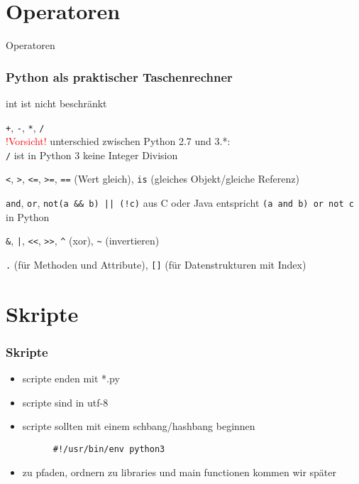 \documentclass{beamer}
\begin{document}
\section{Operatoren}
\begin{frame}[fragile]{Operatoren}
   \frametitle{Python als praktischer Taschenrechner} 
   \begin{description}
       \item<+-> int ist nicht beschränkt
	\item<+->[mathematisch] \alert{\texttt{+}}, \alert{\texttt{-}}, \alert{\texttt{*}}, \alert{\texttt{/}} \\
             \textcolor{red}{!Vorsicht!} unterschied zwischen Python 2.7 und 3.*:\\
      \lstinline+/+ ist in Python 3 keine Integer Division
	    \item<+->[vergleichend] \alert{\texttt{<}}, \alert{\texttt{>}}, \alert{\texttt{<=}}, \alert{\texttt{>=}}, \alert{\texttt{==}} (Wert gleich), \alert{\texttt{is}} (gleiches Objekt/gleiche Referenz)
	    \item<+->[logisch] \alert{\texttt{and}}, \alert{\texttt{or}}, \alert{\texttt{not}}\alert{\texttt{(a \&\& b) || (!c)}} aus C oder Java entspricht \alert{\texttt{(a and b) or not c}} in Python
	    \item<+->[bitweise] \alert{\texttt{\&}}, \alert{\texttt{|}}, \alert{\texttt{<<}}, \alert{\texttt{>>}}, \alert{\texttt{\^}} (xor), \alert{\texttt{\~}} (invertieren)
	    \item<+->[Accessoren] \alert{\texttt{.}} (für Methoden und Attribute), \alert{\texttt{[]}} (für Datenstrukturen mit Index)
	\end{description}
\end{frame}


\section{Skripte}
\begin{frame}[fragile]
  \frametitle{Skripte}
  \begin{itemize}
  \item<1-> scripte enden mit *.py
  \item<1-> scripte sind in utf-8
  \item<2-> scripte sollten mit einem schbang/hashbang beginnen
    \begin{lstlisting}
      #!/usr/bin/env python3
    \end{lstlisting}
  \item<3-> zu pfaden, ordnern zu libraries und main functionen kommen wir später
  \end{itemize}
\end{frame}
\end{document}
